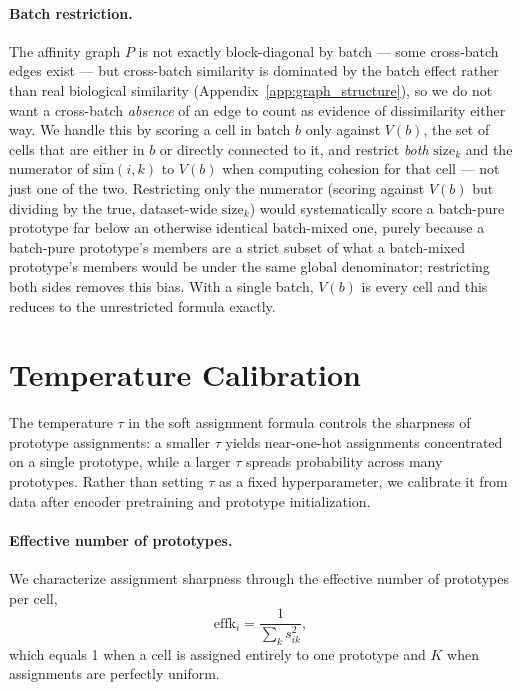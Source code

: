 \paragraph{Batch restriction.}
The affinity graph $P$ is not exactly block-diagonal by batch --- some cross-batch edges exist --- but cross-batch similarity is dominated by the batch effect rather than real biological similarity (Appendix~\ref{app:graph_structure}), so we do not want a cross-batch \emph{absence} of an edge to count as evidence of dissimilarity either way. We handle this by scoring a cell in batch $b$ only against $V(b)$, the set of cells that are either in $b$ or directly connected to it, and restrict \emph{both} $\mathrm{size}_k$ and the numerator of $\overline{\mathrm{sim}}(i,k)$ to $V(b)$ when computing cohesion for that cell --- not just one of the two. Restricting only the numerator (scoring against $V(b)$ but dividing by the true, dataset-wide $\mathrm{size}_k$) would systematically score a batch-pure prototype far below an otherwise identical batch-mixed one, purely because a batch-pure prototype's members are a strict subset of what a batch-mixed prototype's members would be under the same global denominator; restricting both sides removes this bias. With a single batch, $V(b)$ is every cell and this reduces to the unrestricted formula exactly.

\section{Temperature Calibration}
\label{app:calibration}

The temperature $\tau$ in the soft assignment formula controls the sharpness of prototype assignments: a smaller $\tau$ yields near-one-hot assignments concentrated on a single prototype, while a larger $\tau$ spreads probability across many prototypes. Rather than setting $\tau$ as a fixed hyperparameter, we calibrate it from data after encoder pretraining and prototype initialization.

\paragraph{Effective number of prototypes.}
We characterize assignment sharpness through the effective number of prototypes per cell,
\begin{equation}
\mathrm{effk}_i = \frac{1}{\displaystyle\sum_{k} s_{ik}^2},
\end{equation}
which equals 1 when a cell is assigned entirely to one prototype and $K$ when assignments are perfectly uniform.

